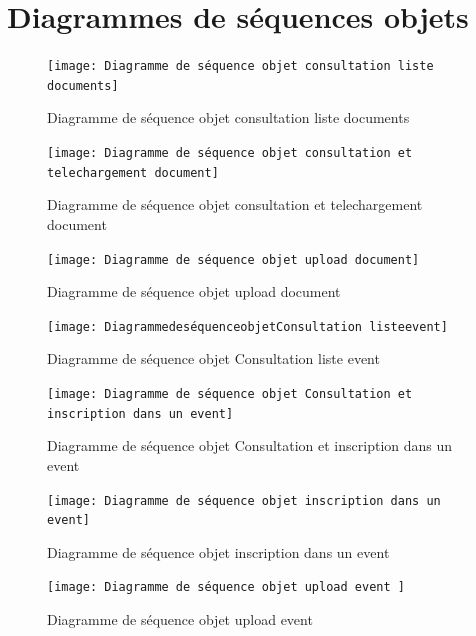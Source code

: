 \documentclass[12pt]{report}
\begin{document}
\section{Diagrammes de séquences objets}

\begin{figure}[h]
    \centering
    \texttt{[image: Diagramme de séquence objet consultation liste documents]}
    \caption{Diagramme de séquence objet consultation liste documents}
    \label{fig:mesh6}
\end{figure}
\newpage

\begin{figure}[h]
    \centering
    \texttt{[image: Diagramme de séquence objet consultation et telechargement document]}
    \caption{Diagramme de séquence objet consultation et telechargement document}
    \label{fig:mesh6}
\end{figure}
\newpage

\begin{figure}[h]
    \centering
    \texttt{[image: Diagramme de séquence objet upload document]}
    \caption{Diagramme de séquence objet upload document}
    \label{fig:mesh6}
\end{figure}
\newpage

\begin{figure}[h]
    \centering
    \texttt{[image: DiagrammedeséquenceobjetConsultation listeevent]}
    \caption{Diagramme de séquence objet  Consultation liste event}
    \label{fig:mesh6}
\end{figure}
\newpage

\begin{figure}[h]
    \centering
    \texttt{[image: Diagramme de séquence objet Consultation et inscription dans un event]}
    \caption{Diagramme de séquence objet Consultation et inscription dans un event}
    \label{fig:mesh6}
\end{figure}
\newpage

\begin{figure}[h]
    \centering
    \texttt{[image: Diagramme de séquence objet inscription dans un event]}
    \caption{Diagramme de séquence objet inscription dans un event}
    \label{fig:mesh6}
\end{figure}
\newpage



\begin{figure}[h]
    \centering
    \texttt{[image: Diagramme de séquence objet upload event ]}
    \caption{Diagramme de séquence objet upload event }
    \label{fig:mesh6}
\end{figure}
\newpage
\end{document}
